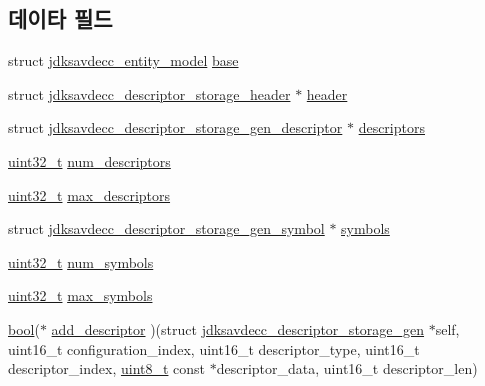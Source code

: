 \subsection*{데이타 필드}
\begin{DoxyCompactItemize}
\item 
struct \hyperlink{structjdksavdecc__entity__model}{jdksavdecc\+\_\+entity\+\_\+model} \hyperlink{structjdksavdecc__descriptor__storage__gen_ab9b4b2eaa5e1a290a371291da6a9a4d6}{base}
\item 
struct \hyperlink{structjdksavdecc__descriptor__storage__header}{jdksavdecc\+\_\+descriptor\+\_\+storage\+\_\+header} $\ast$ \hyperlink{structjdksavdecc__descriptor__storage__gen_ab8b6411f5cc5bef01477313804777e55}{header}
\item 
struct \hyperlink{structjdksavdecc__descriptor__storage__gen__descriptor}{jdksavdecc\+\_\+descriptor\+\_\+storage\+\_\+gen\+\_\+descriptor} $\ast$ \hyperlink{structjdksavdecc__descriptor__storage__gen_ab8ad060f3f5389caccce4de2ec9c2f30}{descriptors}
\item 
\hyperlink{parse_8c_a6eb1e68cc391dd753bc8ce896dbb8315}{uint32\+\_\+t} \hyperlink{structjdksavdecc__descriptor__storage__gen_ab5b9fb75855ea5eaf660e913291dee0b}{num\+\_\+descriptors}
\item 
\hyperlink{parse_8c_a6eb1e68cc391dd753bc8ce896dbb8315}{uint32\+\_\+t} \hyperlink{structjdksavdecc__descriptor__storage__gen_ad0b25b9099c457f6a44f01143309e47f}{max\+\_\+descriptors}
\item 
struct \hyperlink{structjdksavdecc__descriptor__storage__gen__symbol}{jdksavdecc\+\_\+descriptor\+\_\+storage\+\_\+gen\+\_\+symbol} $\ast$ \hyperlink{structjdksavdecc__descriptor__storage__gen_a4998980e6ac72e8672980a51315716c9}{symbols}
\item 
\hyperlink{parse_8c_a6eb1e68cc391dd753bc8ce896dbb8315}{uint32\+\_\+t} \hyperlink{structjdksavdecc__descriptor__storage__gen_ab11a950ed69a3c45cece05500dba884e}{num\+\_\+symbols}
\item 
\hyperlink{parse_8c_a6eb1e68cc391dd753bc8ce896dbb8315}{uint32\+\_\+t} \hyperlink{structjdksavdecc__descriptor__storage__gen_ac43ac59ff766a629fab28c7738d59cf5}{max\+\_\+symbols}
\item 
\hyperlink{avb__gptp_8h_af6a258d8f3ee5206d682d799316314b1}{bool}($\ast$ \hyperlink{structjdksavdecc__descriptor__storage__gen_a3f75bfd7b4c1481a09d9433ce13cd623}{add\+\_\+descriptor} )(struct \hyperlink{structjdksavdecc__descriptor__storage__gen}{jdksavdecc\+\_\+descriptor\+\_\+storage\+\_\+gen} $\ast$self, uint16\+\_\+t configuration\+\_\+index, uint16\+\_\+t descriptor\+\_\+type, uint16\+\_\+t descriptor\+\_\+index, \hyperlink{stdint_8h_aba7bc1797add20fe3efdf37ced1182c5}{uint8\+\_\+t} const $\ast$descriptor\+\_\+data, uint16\+\_\+t descriptor\+\_\+len)

\end{DoxyCompactItemize}
